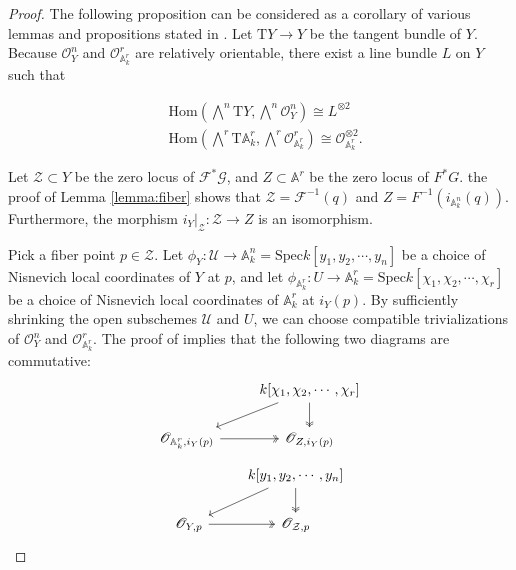 \documentclass[12pt, reqno]{amsart}
\theoremstyle{definition}
\newcommand{\Spec}{\mathrm{Spec }} %
\newcommand{\A}{\mathbb{A}} %
\newcommand{\Oh}{\mathscr{O}} %
\begin{document}
\begin{proof}
The following proposition can be considered as a corollary of various lemmas and propositions stated in \cite[Section 4]{kwcubic}.
Let $\text{T}Y \to Y$ be the tangent bundle of $Y$. Because $\Oh^n_Y$ and $\Oh^r_{\A^r_k}$ are relatively orientable, there exist a line bundle $L$ on $Y$ such that

\begin{align*}
    & \text{Hom}(\bigwedge\nolimits^n \text{T}Y, \bigwedge\nolimits^n \Oh^n_Y) \cong L^{\otimes 2} \\
    & \text{Hom} (\bigwedge\nolimits^r \text{T}\A^r_k, \bigwedge\nolimits^r \Oh^r_{\A^r_k}) \cong \Oh_{\A^r_k}^{\otimes 2}.
\end{align*}

Let $\mathcal{Z} \subset Y$ be the zero locus of $\mathcal{F}^* \mathcal{G}$, and $Z \subset \A^r$ be the zero locus of $F^* G$. the proof of Lemma \ref{lemma:fiber} shows that $\mathcal{Z} = \mathcal{F}^{-1}(q)$ and $Z = F^{-1}(i_{\A^n_k}(q))$. Furthermore, the morphism $i_Y|_{\mathcal{Z}}: \mathcal{Z} \to Z$ is an isomorphism.

Pick a fiber point $p \in \mathcal{Z}$. Let $\phi_Y: \mathcal{U} \to \A^n_k = \Spec k[y_1, y_2, \cdots, y_n]$ be a choice of Nisnevich local coordinates of $Y$ at $p$, and let $\phi_{\A^r_k}: U \to \A^r_k = \Spec k[\chi_1, \chi_2, \cdots, \chi_r]$ be a choice of Nisnevich local coordinates of $\A^r_k$ at $i_Y(p)$. By sufficiently shrinking the open subschemes $\mathcal{U}$ and $U$, we can choose compatible trivializations of $\Oh^n_Y$ and $\Oh^r_{\A^r_k}$. The proof of \cite[Lemma 24]{kwcubic} implies that the following two diagrams are commutative:
\begin{equation*}
\begin{tikzcd}
    & k[\chi_1, \chi_2, \cdots, \chi_r] \arrow[d, twoheadrightarrow] \arrow[dl] \\
    \Oh_{\A^r_k, i_Y(p)} \arrow[r, twoheadrightarrow] & \Oh_{Z,i_Y(p)}
\end{tikzcd}
\end{equation*}
\begin{equation*}
\begin{tikzcd}
    & k[y_1, y_2, \cdots, y_n] \arrow[d, twoheadrightarrow] \arrow[dl] \\
    \Oh_{Y, p} \arrow[r, twoheadrightarrow] & \Oh_{\mathcal{Z}, p}
\end{tikzcd}
\end{equation*}


\end{proof}
\end{document}
